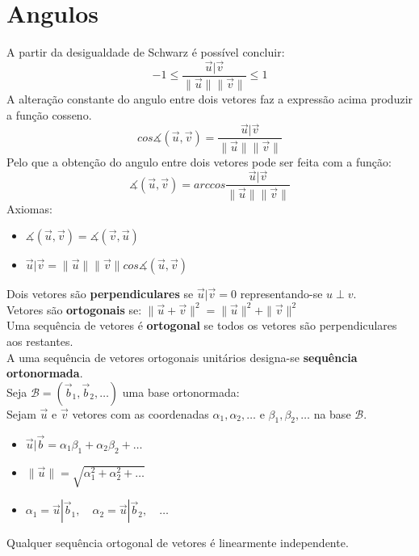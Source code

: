 \documentclass[]{report}
\begin{document}
\section{Angulos}
A partir da desigualdade de Schwarz é possível concluir:
$$-1 \leq \frac{\vec u | \vec v}{\parallel \vec u \parallel \parallel \vec v \parallel} \leq 1$$
A alteração constante do angulo entre dois vetores faz a expressão acima produzir a função cosseno.
$$cos \measuredangle (\vec u, \vec v) = \frac{\vec u | \vec v}{\parallel \vec u \parallel \parallel \vec v \parallel}$$
Pelo que a obtenção do angulo entre dois vetores pode ser feita com a função:
$$\measuredangle (\vec u, \vec v) = arccos \frac{\vec u | \vec v}{\parallel \vec u \parallel \parallel \vec v \parallel}$$
Axiomas:
\begin{itemize}
\item $\measuredangle (\vec u, \vec v) = \measuredangle (\vec v, \vec u)$
\item $\vec u | \vec v = \parallel \vec u \parallel \parallel \vec v \parallel cos \measuredangle (\vec u, \vec v)$
\end{itemize}
Dois vetores são \textbf{perpendiculares} se $\vec u | \vec v = 0$ representando-se $u \perp v$.\\
Vetores são \textbf{ortogonais} se: $\parallel \vec u + \vec v \parallel^2 = \parallel \vec u \parallel^2 + \parallel \vec v \parallel^2$\\
Uma sequência de vetores é \textbf{ortogonal} se todos os vetores são perpendiculares aos restantes.\\
A uma sequência de vetores ortogonais unitários designa-se \textbf{sequência ortonormada}.\\[2mm]
Seja $\mathcal{B} = (\vec b_1, \vec b_2, \dots)$ uma base ortonormada:\\
Sejam $\vec u$ e $\vec v$ vetores com as coordenadas $\alpha_1, \alpha_2, \dots$ e $\beta_1, \beta_2, \dots$ na base $\mathcal{B}$.
\begin{itemize}
\item $\vec u | \vec b = \alpha_1 \beta_1 + \alpha_2 \beta_2 + \dots$
\item $\parallel \vec u \parallel = \sqrt{\alpha_1^2 + \alpha_2^2 + \dots}$
\item $\alpha_1 = \vec u | \vec b_1,\quad \alpha_2 = \vec u | \vec b_2,\quad \dots$
\end{itemize}
Qualquer sequência ortogonal de vetores é linearmente independente.
\end{document}
